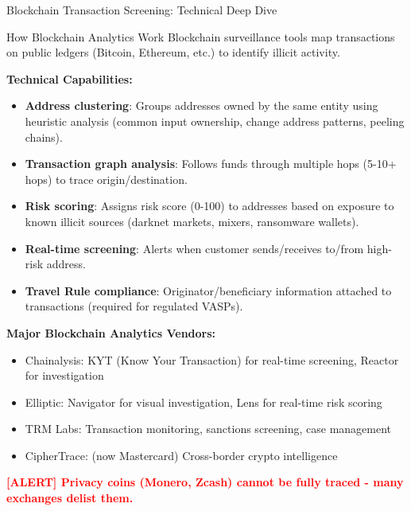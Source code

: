 \documentclass[11pt,a4paper]{beamer}
\newcommand{\redflag}[1]{\textcolor{red}{\textbf{[ALERT] #1}}}
\begin{document}
\begin{frame}{Blockchain Transaction Screening: Technical Deep Dive}
	\begin{block}{How Blockchain Analytics Work}
		Blockchain surveillance tools map transactions on public ledgers (Bitcoin, Ethereum, etc.) to identify illicit activity.
	\end{block}
	\textbf{Technical Capabilities:}
	\begin{itemize}
		\item \textbf{Address clustering}: Groups addresses owned by the same entity using heuristic analysis (common input ownership, change address patterns, peeling chains).
		\item \textbf{Transaction graph analysis}: Follows funds through multiple hops (5-10+ hops) to trace origin/destination.
		\item \textbf{Risk scoring}: Assigns risk score (0-100) to addresses based on exposure to known illicit sources (darknet markets, mixers, ransomware wallets).
		\item \textbf{Real-time screening}: Alerts when customer sends/receives to/from high-risk address.
		\item \textbf{Travel Rule compliance}: Originator/beneficiary information attached to transactions (required for regulated VASPs).
	\end{itemize}
	\textbf{Major Blockchain Analytics Vendors:}
	\begin{itemize}
		\item Chainalysis: KYT (Know Your Transaction) for real-time screening, Reactor for investigation
		\item Elliptic: Navigator for visual investigation, Lens for real-time risk scoring
		\item TRM Labs: Transaction monitoring, sanctions screening, case management
		\item CipherTrace: (now Mastercard) Cross-border crypto intelligence
	\end{itemize}
	\redflag{Privacy coins (Monero, Zcash) cannot be fully traced - many exchanges delist them.}
\end{frame}
\end{document}
